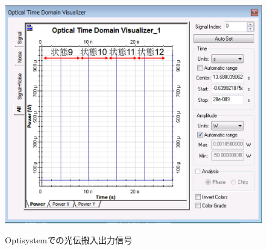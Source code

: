 \begin{figure}[t!]
\begin{center}
{\includegraphics[keepaspectratio,scale=0.29]{fig/4/light_in_3_2_9.png}
\label{fig:test_in3}}
\caption{Optisystemでの光伝搬入出力信号}
\label{fig:test}
\end{center}
\end{figure}

